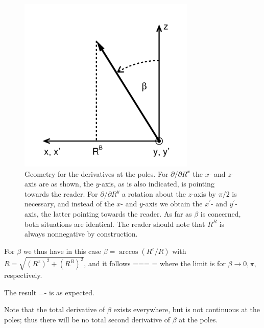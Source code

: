 \begin{figure}
\begin{center}
\includegraphics[width=0.75\textwidth]{figures/Abbildung2}
\end{center}
\caption[Geometry for the derivatives at the poles]{Geometry for the derivatives at the poles. For $\partial/\partial R^{x}$ the $x$- and $z$-
axis are as shown, the $y$-axis, as is also indicated, is pointing towards the reader.
For $\partial/\partial R^{y}$ a rotation about the $z$-axis by $\pi/2$ is necessary, and instead of the
$x$- and $y$-axis we obtain the $x^{\prime}$- and $y^{\prime}$-axis, the latter pointing towards the
reader. As far as $\beta$ is concerned, both situations are identical. The reader should note that
$R^{B}$ is always nonnegative by construction.}
\label{restricted}
\end{figure}
\par{For $\beta$ we thus have in this case $\beta=\arccos (R^{z}/R)$ with $R=\sqrt{(R^{z})^{2}+(R^{B})^{2}}$,
and it follows}
\be
\label{betalimit}
===
=\rightarrow \pm {}
\ee
where the limit is for $\beta \rightarrow 0,\pi$, respectively.
\par{The result}
\be
{}=-
\ee
is as expected.
\par{Note that the total derivative of $\beta$ exists everywhere, but is not continuous at the poles; thus there
will be no total second derivative of $\beta$ at the poles.}
